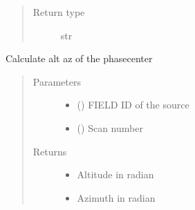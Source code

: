 \documentclass[letterpaper,10pt,english]{sphinxmanual}
\begin{document}
\begin{fulllineitems}
\begin{fulllineitems}
\begin{quote}
\begin{description}
\item[{Return type}] \leavevmode
\sphinxAtStartPar
str

\end{description}\end{quote}

\end{fulllineitems}


\begin{fulllineitems}
\label{\detokenize{paircars:paircars.access_ms.AccessMS.get_altaz}}
\sphinxAtStartPar
Calculate alt az of the phasecenter
\begin{quote}\begin{description}
\item[{Parameters}] \leavevmode\begin{itemize}
\item {} 
\sphinxAtStartPar
{} () \textendash{} FIELD ID of the source

\item {} 
\sphinxAtStartPar
{} () \textendash{} Scan number

\end{itemize}

\item[{Returns}] \leavevmode
\sphinxAtStartPar
\begin{itemize}
\item {} 
\sphinxAtStartPar
{} \textendash{} Altitude in radian

\item {} 
\sphinxAtStartPar
{} \textendash{} Azimuth in radian

\end{itemize}


\end{description}\end{quote}

\end{fulllineitems}


\end{fulllineitems}
\end{document}

